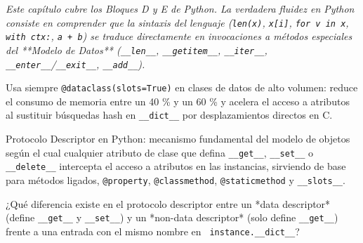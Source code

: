 \documentclass{book}
\begin{document}
\noindent\textit{Este capítulo cubre los Bloques D y E de Python. La verdadera fluidez en Python consiste en comprender que la sintaxis del lenguaje (\texttt{len(x)}, \texttt{x[i]}, \texttt{for v in x}, \texttt{with ctx:}, \texttt{a + b}) se traduce directamente en invocaciones a métodos especiales del **Modelo de Datos** (\texttt{\_\_len\_\_}, \texttt{\_\_getitem\_\_}, \texttt{\_\_iter\_\_}, \texttt{\_\_enter\_\_}/\texttt{\_\_exit\_\_}, \texttt{\_\_add\_\_}).}

\begin{tcolorbox}[title={Consejo}, studiumtip, breakable]

Usa siempre \texttt{@dataclass(slots=True)} en clases de datos de alto volumen: reduce el consumo de memoria entre un 40 \% y un 60 \% y acelera el acceso a atributos al sustituir búsquedas hash en \texttt{\_\_dict\_\_} por desplazamientos directos en C.
\end{tcolorbox}

\begin{tcolorbox}[title={Definición}, studiumdef, breakable]

Protocolo Descriptor en Python: mecanismo fundamental del modelo de objetos según el cual cualquier atributo de clase que defina \texttt{\_\_get\_\_}, \texttt{\_\_set\_\_} o \texttt{\_\_delete\_\_} intercepta el acceso a atributos en las instancias, sirviendo de base para métodos ligados, \texttt{@property}, \texttt{@classmethod}, \texttt{@staticmethod} y \texttt{\_\_slots\_\_}.
\end{tcolorbox}

\begin{tcolorbox}[title={Autoficha}, studiumcheck, breakable]

¿Qué diferencia existe en el protocolo descriptor entre un *data descriptor* (define \texttt{\_\_get\_\_} y \texttt{\_\_set\_\_}) y un *non-data descriptor* (solo define \texttt{\_\_get\_\_}) frente a una entrada con el mismo nombre en \texttt{ instance.\_\_dict\_\_}?
\end{tcolorbox}
\end{document}
